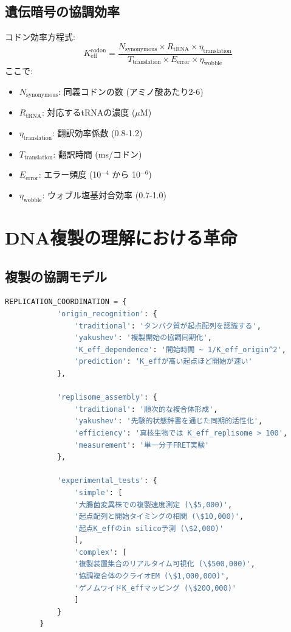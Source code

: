 \documentclass[12pt]{article}
\begin{document}
	\subsection{遺伝暗号の協調効率}
	
	コドン効率方程式:
	\[
	K_{\text{eff}}^{\text{codon}} = \frac{N_{\text{synonymous}} \times R_{\text{tRNA}} \times \eta_{\text{translation}}}{T_{\text{translation}} \times E_{\text{error}} \times \eta_{\text{wobble}}}
	\]
	ここで:
	\begin{itemize}
		\item $N_{\text{synonymous}}$: 同義コドンの数 (アミノ酸あたり2-6)
		\item $R_{\text{tRNA}}$: 対応するtRNAの濃度 ($\mu$M)
		\item $\eta_{\text{translation}}$: 翻訳効率係数 (0.8-1.2)
		\item $T_{\text{translation}}$: 翻訳時間 (ms/コドン)
		\item $E_{\text{error}}$: エラー頻度 (10$^{-4}$ から 10$^{-6}$)
		\item $\eta_{\text{wobble}}$: ウォブル塩基対合効率 (0.7-1.0)
	\end{itemize}
	
	\section{DNA複製の理解における革命}
	
	\subsection{複製の協調モデル}
	
	\begin{lstlisting}[language=Python, caption={同期協調としての複製}, label={lst:rep}, breaklines=true]
		REPLICATION_COORDINATION = {
			'origin_recognition': {
				'traditional': 'タンパク質が起点配列を認識する',
				'yakushev': '複製開始の協調同期化',
				'K_eff_dependence': '開始時間 ~ 1/K_eff_origin^2',
				'prediction': 'K_effが高い起点ほど開始が速い'
			},
			
			'replisome_assembly': {
				'traditional': '順次的な複合体形成',
				'yakushev': '先験的状態辞書を通じた同期的活性化',
				'efficiency': '真核生物では K_eff_replisome > 100',
				'measurement': '単一分子FRET実験'
			},
			
			'experimental_tests': {
				'simple': [
				'大腸菌変異株での複製速度測定 (\$5,000)',
				'起点配列と開始タイミングの相関 (\$10,000)',
				'起点K_effのin silico予測 (\$2,000)'
				],
				'complex': [
				'複製装置集合のリアルタイム可視化 (\$500,000)',
				'協調複合体のクライオEM (\$1,000,000)',
				'ゲノムワイドK_effマッピング (\$200,000)'
				]
			}
		}
	\end{lstlisting}
	
\end{document}
